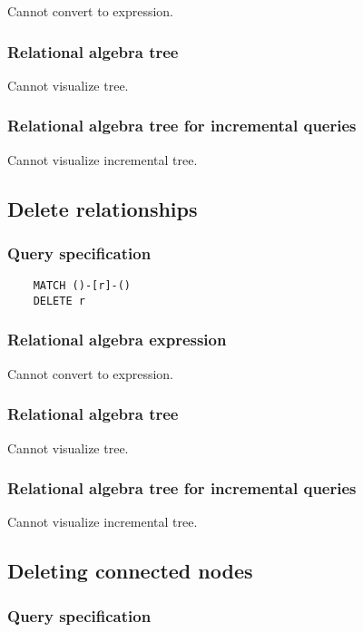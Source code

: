 	Cannot convert to expression.

	\subsubsection*{Relational algebra tree}

	Cannot visualize tree.

	\subsubsection*{Relational algebra tree for incremental queries}

	Cannot visualize incremental tree.
	\subsection{Delete relationships}

	\subsubsection*{Query specification}

	\begin{lstlisting}
	MATCH ()-[r]-()
	DELETE r
	\end{lstlisting}


	\subsubsection*{Relational algebra expression}

	Cannot convert to expression.

	\subsubsection*{Relational algebra tree}

	Cannot visualize tree.

	\subsubsection*{Relational algebra tree for incremental queries}

	Cannot visualize incremental tree.
	\subsection{Deleting connected nodes}

	\subsubsection*{Query specification}

